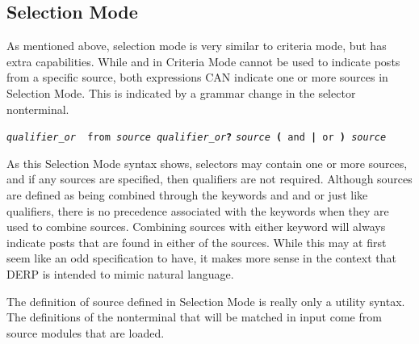 \subsection{Selection Mode}\label{Selection_Mode}
As mentioned above, selection mode is very similar to criteria mode, but has extra capabilities. While  and  in Criteria Mode
cannot be used to indicate posts from a specific source, both expressions CAN indicate one or more sources in Selection Mode. This is indicated by a grammar
change in the selector nonterminal.
\begin{description}[labelindent=1cm,leftmargin=\onelen,labelwidth=1cm]
     \texttt{\textit{qualifier\_or} \textbf{\textbar} from \textit{source qualifier\_or}\textbf{?}}
     \texttt{\textit{source} \textbf{(} and \textbf{|} or \textbf{)} \textit{source}}
\end{description}
As this Selection Mode syntax shows, selectors may contain one or more sources, and if any sources are specified, then qualifiers are not required. Although
sources are defined as being combined through the keywords and and or just like qualifiers, there is no precedence associated with the keywords when they
are used to combine sources. Combining sources with either keyword will always indicate posts that are found in either of the sources. While this may at
first seem like an odd specification to have, it makes more sense in the context that DERP is intended to mimic natural language.

The definition of source defined in Selection Mode is really only a utility syntax. The definitions of the nonterminal that will be matched in input come
from source modules that are loaded.

